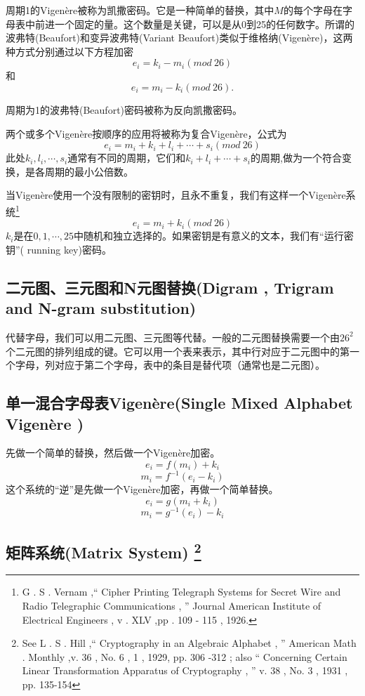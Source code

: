 \documentclass[]{article}
\begin{document}
周期1的Vigen\`{e}re被称为凯撒密码。它是一种简单的替换，其中$M$的每个字母在字母表中前进一个固定的量。这个数量是关键，可以是从0到25的任何数字。所谓的波弗特(Beaufort)和变异波弗特(Variant Beaufort)类似于维格纳(Vigen\`{e}re)，这两种方式分别通过以下方程加密
\[e_i=k_i-m_i(mod\ 26)\]
和
\[e_i=m_i-k_i(mod\ 26).\]

周期为1的波弗特(Beaufort)密码被称为反向凯撒密码。

两个或多个Vigen\`{e}re按顺序的应用将被称为复合Vigen\`{e}re，公式为
\[e_i=m_i+k_i+l_i+\cdots + s_i(mod\ 26)\]
此处$k_i,l_i,\cdots,s_i$通常有不同的周期，它们和$k_i+l_i+\cdots+s_i$的周期,做为一个符合变换，是各周期的最小公倍数。

当Vigen\`{e}re使用一个没有限制的密钥时，且永不重复，我们有这样一个Vigen\`{e}re系统\footnote{G . S . Vernam ,“ Cipher Printing Telegraph Systems for Secret Wire and Radio Telegraphic Communications , ” Journal American Institute of Electrical Engineers , v . XLV ,pp . 109 - 115 , 1926.}
\[e_i=m_i+k_i(mod\ 26)\]
$k_i$是在$0,1,\cdots,25$中随机和独立选择的。如果密钥是有意义的文本，我们有“运行密钥”( running key)密码。

\subsection{二元图、三元图和N元图替换(Digram , Trigram and N-gram substitution)}

代替字母，我们可以用二元图、三元图等代替。一般的二元图替换需要一个由$26^2$个二元图的排列组成的键。它可以用一个表来表示，其中行对应于二元图中的第一个字母，列对应于第二个字母，表中的条目是替代项（通常也是二元图）。

\subsection{单一混合字母表Vigen\`{e}re(Single Mixed Alphabet Vigen\`{e}re )}
先做一个简单的替换，然后做一个Vigen\`{e}re加密。
\[e_i=f(m_i)+k_i\]
\[m_i=f^{-1}(e_i-k_i)\]
这个系统的“逆”是先做一个Vigen\`{e}re加密，再做一个简单替换。
\[e_i=g(m_i+k_i)\]
\[m_i=g^{-1}(e_i)-k_i\]

\subsection{矩阵系统(Matrix System) \protect\footnote{See L . S . Hill ,“ Cryptography in an Algebraic Alphabet , ” American Math . Monthly ,v. 36 , No. 6 , 1 , 1929, pp. 306 -312 ; also “ Concerning Certain Linear Transformation Apparatus of Cryptography , ” v. 38 , No. 3 , 1931 , pp. 135-154 } }
\end{document}
